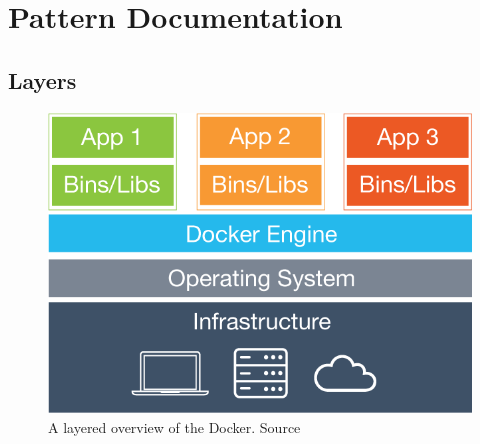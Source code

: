 
\clearpage
\chapter{Pattern Documentation}
\label{ch:patterns}


\section{Layers}

\begin{figure}[H]
\centering
\includegraphics[scale=0.4]{5-patterns/images/what-is-vm-diagram.png}
\caption{A layered overview of the Docker. Source \cite{whatisdocker}}
\label{fig:layers-pattern}
\end{figure}

